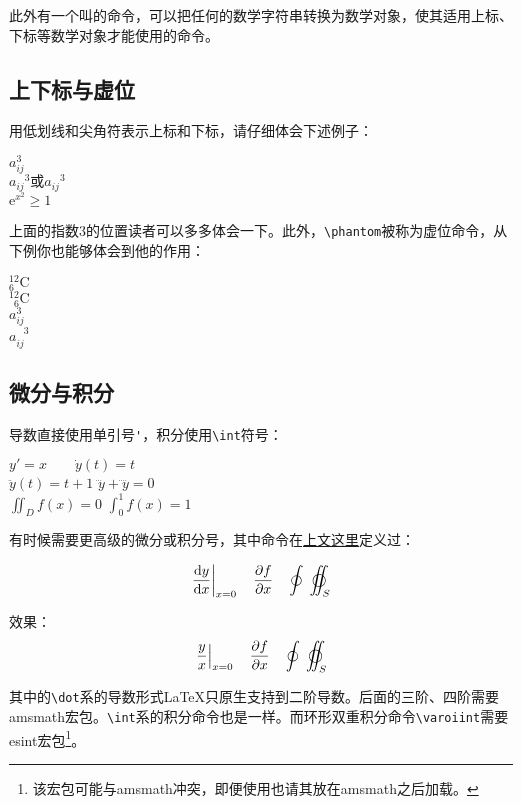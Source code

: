 {此外有一个叫\latexline{\\mathop}的命令，可以把任何的数学字符串转换为数学对象，使其适用上标、下标等数学对象才能使用的命令。

\subsection{上下标与虚位}
用低划线和尖角符表示上标和下标，请仔细体会下述例子：

\begin{codeshow}
$a^3_{ij}$ \\
${a_{ij}}^3\text{或}a_{ij}{}^3$\\
$\mathrm{e}^{x^2}\geq 1$
\end{codeshow}

上面的指数3的位置读者可以多多体会一下。此外，\verb|\phantom|被称为虚位命令，从下例你也能够体会到他的作用：

\begin{codeshow}
${}^{12}_{6}\mathrm{C}$ \\
${}^{12}_{\phantom{1}6}
\mathrm{C}$ \\
$a^3_{ij}$ \\
$a^{\phantom{ij}3}_{ij}$
\end{codeshow}

\subsection{微分与积分}
导数直接使用单引号\verb|'|，积分使用\verb|\int|符号：

\begin{codeshow}
$y'=x \qquad \dot{y}(t)=t$ \\
$\ddot{y}(t)=t+1$
$\dddot{y}+\ddddot{y}=0$ \\
$\iint_{D}f(x)=0$
$\int_{0}^{1}f(x)=1$
\end{codeshow}

有时候需要更高级的微分或积分号，其中\latexline{\\ud}命令在\hyperref[cmd:ud]{上文这里}定义过：
\begin{latex}{}
\[\left.\frac{\ud y}{\ud x}\right|_{x=0}
\quad\frac{\partial f}{\partial x}
\quad\oint\;\varoiint_S \]
\end{latex}

效果：
\[\left.\frac{y}{x}\right|_{x=0}
\quad\frac{\partial f}{\partial x}\quad
\oint\;\varoiint_S \]

其中的\verb|\dot|系的导数形式\LaTeX 只原生支持到二阶导数。后面的三阶、四阶需要amsmath宏包。\verb|\int|系的积分命令也是一样。而环形双重积分命令\verb|\varoiint|需要esint宏包\footnote{该宏包可能与amsmath冲突，即便使用也请其放在amsmath之后加载。}。

}
